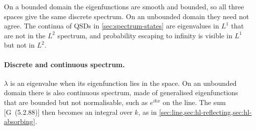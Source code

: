 \documentclass[11pt]{article}
\numberwithin{equation}{section}
\newcommand{\G}[1]{[G~(#1)]}
\begin{document}
On a bounded domain the eigenfunctions are smooth and bounded, so all three spaces give the same discrete
spectrum. On an unbounded domain they need not agree. The continua of QSDs in \cref{sec:spectrum-states} are
eigenvalues in $L^1$ that are not in the $L^2$ spectrum, and probability escaping to infinity is visible in $L^1$
but not in $L^2$.

\paragraph{Discrete and continuous spectrum.} $\lambda$ is an eigenvalue when its eigenfunction lies in the space.
On an unbounded domain there is also continuous spectrum, made of generalised eigenfunctions that are bounded
but not normalisable, such as $e^{ikx}$ on the line. The sum \G{5.2.88} then becomes an integral over $k$, as in
\cref{sec:line,sec:hl-reflecting,sec:hl-absorbing}.
\end{document}
